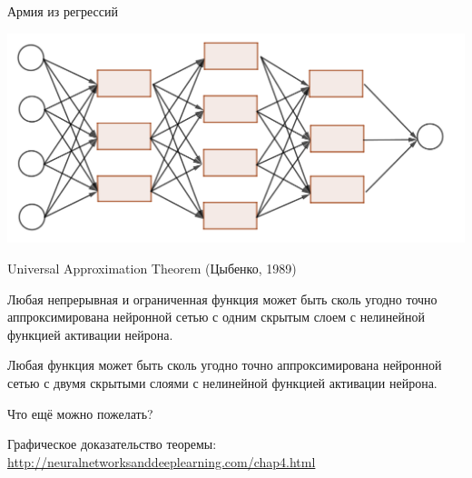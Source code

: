 \documentclass[notes,12pt, aspectratio=169]{beamer}
\newenvironment{wideitemize}{\itemize\addtolength{\itemsep}{10pt}}{\enditemize}
\begin{document}
\begin{frame}{Армия из регрессий}
	\begin{center}
		\includegraphics[width=0.8\paperwidth]{network.png}
	\end{center}
\end{frame}


\begin{frame}{Universal Approximation Theorem (Цыбенко, 1989)}
	\begin{wideitemize}
		\item Любая непрерывная и ограниченная функция может быть сколь угодно точно аппроксимирована нейронной сетью с одним скрытым слоем с нелинейной функцией активации нейрона.
		
		\item Любая функция может быть сколь угодно точно аппроксимирована нейронной сетью с двумя скрытыми слоями с нелинейной функцией активации нейрона.
		
		\item Что ещё можно пожелать?
	\end{wideitemize}

\vfill %
\footnotesize Графическое доказательство теоремы:  \\
\color{blue} \url{http://neuralnetworksanddeeplearning.com/chap4.html}
\end{frame}
\end{document}

